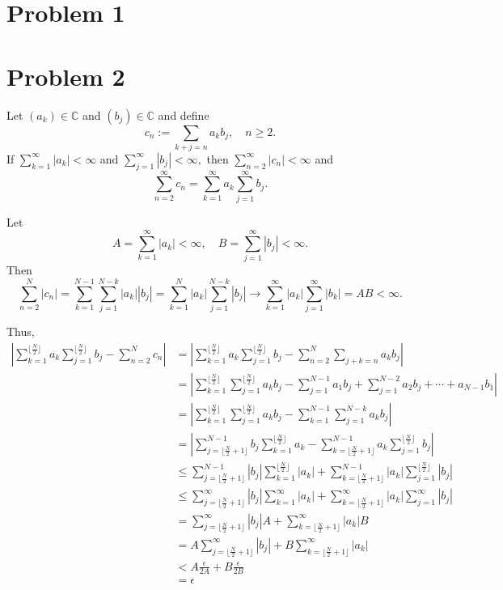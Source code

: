 \documentclass[11pt]{article}
\newcommand{\bbC}{\mathbb{C}}
\begin{document}
	
	\psetheader
\section*{Problem 1}

\newpage
\section*{Problem 2}
\begin{problem}
    Let $(a_k) \in \bbC$ and $(b_j) \in \bbC$ and define 
    \[c_n := \sum_{k+j = n} a_kb_j, \quad n \geq 2.\] If $\sum_{k=1}^\infty |a_k| < \infty$ and $\sum_{j=1}^\infty |b_j| < \infty,$ then $\sum_{n=2}^\infty |c_n| <\infty$ and 
    \[\sum_{n=2}^\infty c_n = \sum_{k=1}^\infty a_k \sum_{j=1}^\infty b_j.\]
\end{problem}
\begin{solution}
    Let 
    \[A = \sum_{k=1}^\infty |a_k| < \infty, \quad B = \sum_{j=1}^\infty |b_j| < \infty.\] Then 
    \[\sum_{n=2}^N |c_n| = \sum_{k=1}^{N-1}\sum_{j=1}^{N-k}|a_k||b_j| = \sum_{k=1}^N|a_k| \sum_{j=1}^{N-k}|b_j| \to \sum_{k=1}^\infty |a_k| \sum_{j=1}^\infty |b_k| = AB < \infty.\]
     
     Thus, 
    \begin{align*}
    \left|\sum_{k=1}^{\lfloor\frac{N}{2}\rfloor}a_k \sum_{j=1}^{\lfloor\frac{N}{2}\rfloor}b_j - \sum_{n=2}^N c_n\right| &= 
    \left|\sum_{k=1}^{\lfloor\frac{N}{2}\rfloor}a_k \sum_{j=1}^{\lfloor\frac{N}{2}\rfloor}b_j - \sum_{n=2}^N \sum_{j + k  = n} a_kb_j\right|\\
    &= \left|\sum_{k=1}^{\lfloor\frac{N}{2}\rfloor} \sum_{j=1}^{\lfloor\frac{N}{2}\rfloor} a_k b_j - \sum_{j=1}^{N-1}a_1b_j + \sum_{j=1}^{N-2}a_2 b_j + \cdots + a_{N-1}b_1\right|\\
    &= \left|\sum_{k=1}^{\lfloor\frac{N}{2}\rfloor} \sum_{j=1}^{\lfloor\frac{N}{2}\rfloor} a_k b_j - \sum_{k=1}^{N-1}\sum_{j=1}^{N-k}a_kb_j\right|\\
    &= \left|\sum_{j= \lfloor\frac{N}{2} + 1\rfloor}^{N-1} b_j\sum_{k=1}^{\lfloor \frac{N}{2}\rfloor}a_k-\sum_{k= \lfloor\frac{N}{2} + 1\rfloor}^{N-1} a_k\sum_{j=1}^{\lfloor \frac{N}{2}\rfloor}b_j\right|\\
    &\leq \sum_{j= \lfloor\frac{N}{2} + 1\rfloor}^{N-1} |b_j|\sum_{k=1}^{\lfloor \frac{N}{2}\rfloor}|a_k| + \sum_{k= \lfloor\frac{N}{2} + 1\rfloor}^{N-1} |a_k|\sum_{j=1}^{\lfloor \frac{N}{2}\rfloor}|b_j|\\
    &\leq \sum_{j= \lfloor\frac{N}{2} + 1\rfloor}^{\infty} |b_j|\sum_{k=1}^{\infty}|a_k| + \sum_{k= \lfloor\frac{N}{2} + 1\rfloor}^{\infty} |a_k|\sum_{j=1}^{\infty}|b_j|\\
    &=\sum_{j= \lfloor\frac{N}{2} + 1\rfloor}^{\infty} |b_j| A + \sum_{k= \lfloor\frac{N}{2} + 1\rfloor}^{\infty} |a_k| B\\
    &= A \sum_{j= \lfloor\frac{N}{2} + 1\rfloor}^{\infty} |b_j|  + B\sum_{k= \lfloor\frac{N}{2} + 1\rfloor}^{\infty} |a_k| \\
    &< A\frac{\epsilon}{2A} + B\frac{\epsilon}{2B}\\
    &= \epsilon
    \end{align*}
\end{solution}
\end{document}
